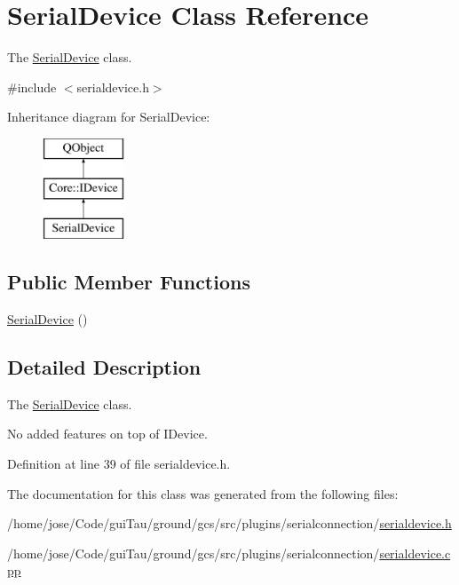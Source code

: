 \hypertarget{class_serial_device}{\section{Serial\-Device Class Reference}
\label{class_serial_device}
}


The \hyperlink{class_serial_device}{Serial\-Device} class.  




{\ttfamily \#include $<$serialdevice.\-h$>$}

Inheritance diagram for Serial\-Device\-:\begin{figure}[H]
\begin{center}
\leavevmode
\includegraphics[height=3.000000cm]{class_serial_device}
\end{center}
\end{figure}
\subsection*{Public Member Functions}
\begin{DoxyCompactItemize}
\item 
\hyperlink{group___core_plugin_gaad126bede3b0adf49e1fbe3afd7c6c42}{Serial\-Device} ()
\end{DoxyCompactItemize}


\subsection{Detailed Description}
The \hyperlink{class_serial_device}{Serial\-Device} class. 

No added features on top of I\-Device. 

Definition at line 39 of file serialdevice.\-h.



The documentation for this class was generated from the following files\-:\begin{DoxyCompactItemize}
\item 
/home/jose/\-Code/gui\-Tau/ground/gcs/src/plugins/serialconnection/\hyperlink{serialdevice_8h}{serialdevice.\-h}\item 
/home/jose/\-Code/gui\-Tau/ground/gcs/src/plugins/serialconnection/\hyperlink{serialdevice_8cpp}{serialdevice.\-cpp}\end{DoxyCompactItemize}
